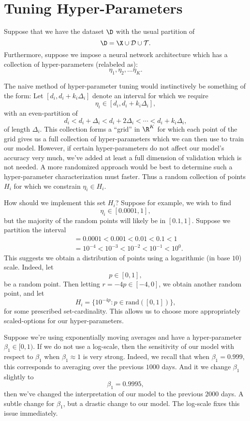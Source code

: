 

\section{Tuning Hyper-Parameters}

Suppose that we have the dataset $\D$ with the usual partition of
$$\D=\X\cup\mathcal{D}\cup\mathcal{T}.$$
Furthermore, suppose we impose a neural network architecture which has a collection of hyper-parameters (relabeled as):
$$\eta_1,\eta_2,...\eta_K.$$

The naive method of hyper-parameter tuning would instinctively be something of the form: Let $[d_i,d_i+k_i\Delta_i]$ denote an interval for which we require
$$\eta_i\in[d_i,d_i+k_i\Delta_i],$$
with an even-partition of 
$$d_i<d_i+\Delta_i<d_i+2\Delta_i<\cdots<d_i+k_i\Delta_i,$$
of length $\Delta_i$.  This collection forms a ``grid'' in $\R^K$ for which each point of the grid gives us a full collection of hyper-parameters which we can then use to train our model.  However, if certain hyper-parameters do not affect our model's accuracy very much, we've added at least a full dimension of validation which is not needed.  A more randomized approach would be best to determine such a hyper-parameter characterization must faster.  Thus a random collection of points $H_i$ for which we constrain $\eta_i\in H_i$.

How should we implement this set $H_i$?  Suppose for example, we wish to find
$$\eta_i\in[0.0001, 1],$$
but the majority of the random points will likely be in $[0.1,1]$.  Suppose we partition the interval
\begin{align*}
	[0.0001,1]&=0.0001<0.001<0.01<0.1<1\\
	&=10^{-4}<10^{-3}<10^{-2}<10^{-1}<10^0.
\end{align*}
This suggests we obtain a distribution of points using a logarithmic (in base $10$) scale.  Indeed, let
$$p\in[0,1],$$
be a random point.  Then letting $r=-4p\in[-4,0]$, we obtain another random point, and let
$$H_i=\{10^{-4p}:p\in\text{rand}([0,1])\},$$
for some prescribed set-cardinality.  This allows us to choose more appropriately scaled-options for our hyper-parameters.

\begin{remark}
	Suppose we're using exponentially moving averages and have a hyper-parameter $\beta_1\in[0,1)$.  If we do not use a log-scale, then the sensitivity of our model with respect to $\beta_1$ when $\beta_1\approx 1$ is very strong.  Indeed, we recall that when $\beta_1=0.999$, this corresponds to averaging over the previous $1000$ days.  And it we change $\beta_1$ slightly to
	$$\beta_1=0.9995,$$
	then we've changed the interpretation of our model to the previous $2000$ days.  A subtle change for $\beta_1$, but a drastic change to our model.  The log-scale fixes this issue immediately.
\end{remark}

